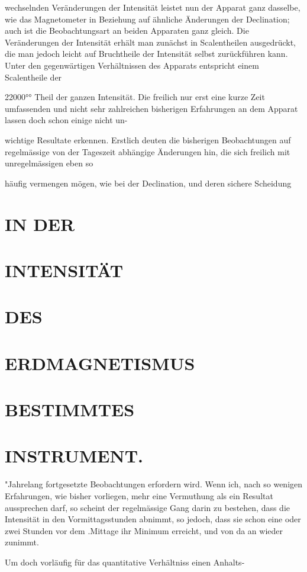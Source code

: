 \documentclass[12pt,a4paper]{article}
\begin{document}
wechselnden Veränderungen der Intensität leistet nun der Apparat ganz dasselbe, wie das Magnetometer in Beziehung auf ähnliche Änderungen der Declination; auch ist die Beobachtungsart an beiden Apparaten ganz gleich. Die Veränderungen der Intensität erhält man zunächst in Scalentheilen ausgedrückt, die man jedoch leicht auf Bruchtheile der Intensität selbst zurückführen kann. Unter den gegenwärtigen Verhältnissen des Apparats entspricht einem Scalentheile der

22000°° Theil der ganzen Intensität. Die freilich nur erst eine kurze Zeit umfassenden und nicht sehr zahlreichen bisherigen Erfahrungen an dem Apparat lassen doch schon einige nicht un-

wichtige Resultate erkennen. Erstlich deuten die bisherigen Beobachtungen auf regelmässige von der Tageszeit abhängige Änderungen hin, die sich freilich mit unregelmässigen eben so

häufig vermengen mögen, wie bei der Declination, und deren sichere Scheidung

\section*{IN DER}
\section*{INTENSITÄT}
\section*{DES}
\section*{ERDMAGNETISMUS}
\section*{BESTIMMTES}
\section*{INSTRUMENT.}
"Jahrelang fortgesetzte Beobachtungen erfordern wird. Wenn ich, nach so wenigen Erfahrungen, wie bisher vorliegen, mehr eine Vermuthung als ein Resultat aussprechen darf, so scheint der regelmässige Gang darin zu bestehen, dass die Intensität in den Vormittagsstunden abnimmt, so jedoch, dass sie schon eine oder zwei Stunden vor dem .Mittage ihr Minimum erreicht, und von da an wieder zunimmt.

Um doch vorläufig für das quantitative Verhältniss einen Anhalts-
\end{document}
